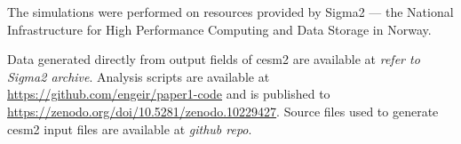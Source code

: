 \documentclass{ametsocV6.1}
\begin{document}
\clearpage
\acknowledgments{}

The simulations were performed on resources provided by Sigma2 --- the National
Infrastructure for High Performance Computing and Data Storage in Norway.

%
%
\datastatement{}

Data generated directly from output fields of \gls{cesm2} are available at \emph{refer
  to Sigma2 archive}. Analysis scripts are available at
\url{https://github.com/engeir/paper1-code} and is published to
\url{https://zenodo.org/doi/10.5281/zenodo.10229427}. Source files used to generate
\gls{cesm2} input files are available at \emph{github repo}.

%


\end{document}

